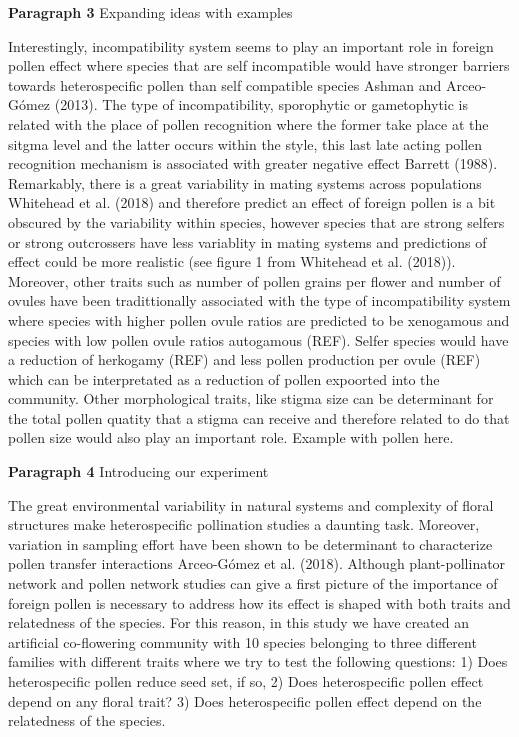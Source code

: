 \documentclass[11pt,a4paper]{article}
\begin{document}
\textbf{Paragraph 3} Expanding ideas with examples

Interestingly, incompatibility system seems to play an important role in
foreign pollen effect where species that are self incompatible would
have stronger barriers towards heterospecific pollen than self
compatible species Ashman and Arceo-Gómez (2013). The type of
incompatibility, sporophytic or gametophytic is related with the place
of pollen recognition where the former take place at the sitgma level
and the latter occurs within the style, this last late acting pollen
recognition mechanism is associated with greater negative effect Barrett
(1988). Remarkably, there is a great variability in mating systems
across populations Whitehead et al. (2018) and therefore predict an
effect of foreign pollen is a bit obscured by the variability within
species, however species that are strong selfers or strong outcrossers
have less variablity in mating systems and predictions of effect could
be more realistic (see figure 1 from Whitehead et al. (2018)). Moreover,
other traits such as number of pollen grains per flower and number of
ovules have been tradittionally associated with the type of
incompatibility system where species with higher pollen ovule ratios are
predicted to be xenogamous and species with low pollen ovule ratios
autogamous (REF). Selfer species would have a reduction of herkogamy
(REF) and less pollen production per ovule (REF) which can be
interpretated as a reduction of pollen expoorted into the community.
Other morphological traits, like stigma size can be determinant for the
total pollen quatity that a stigma can receive and therefore related to
do that pollen size would also play an important role. Example with
pollen here.

\textbf{Paragraph 4} Introducing our experiment

The great environmental variability in natural systems and complexity of
floral structures make heterospecific pollination studies a daunting
task. Moreover, variation in sampling effort have been shown to be
determinant to characterize pollen transfer interactions Arceo-Gómez et
al. (2018). Although plant-pollinator network and pollen network studies
can give a first picture of the importance of foreign pollen is
necessary to address how its effect is shaped with both traits and
relatedness of the species. For this reason, in this study we have
created an artificial co-flowering community with 10 species belonging
to three different families with different traits where we try to test
the following questions: 1) Does heterospecific pollen reduce seed set,
if so, 2) Does heterospecific pollen effect depend on any floral trait?
3) Does heterospecific pollen effect depend on the relatedness of the
species.
\end{document}
